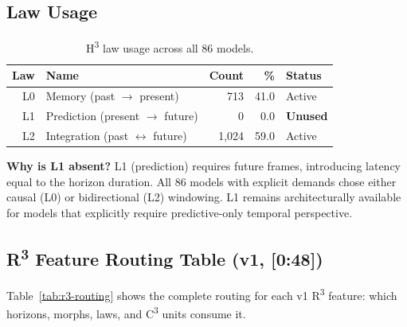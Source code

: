 \subsection{Law Usage}
\label{subsec:routing-laws}

\begin{table}[H]
\centering
\caption{H\textsuperscript{3} law usage across all 86 models.}
\label{tab:law-usage}
\renewcommand{\arraystretch}{1.15}
\begin{tabular}{@{}rlrrl@{}}
\toprule
\textbf{Law} & \textbf{Name} & \textbf{Count} & \textbf{\%} & \textbf{Status} \\
\midrule
L0 & Memory (past $\to$ present)               & 713  & 41.0 & Active \\
L1 & Prediction (present $\to$ future)          &   0  &  0.0 & \textbf{Unused} \\
L2 & Integration (past $\leftrightarrow$ future) & 1{,}024 & 59.0 & Active \\
\bottomrule
\end{tabular}
\end{table}

\noindent
\textbf{Why is L1 absent?}\quad
L1 (prediction) requires future frames, introducing latency equal
to the horizon duration.
All 86 models with explicit demands chose either causal (L0) or
bidirectional (L2) windowing.
L1 remains architecturally available for models that explicitly
require predictive-only temporal perspective.


\subsection{R\textsuperscript{3} Feature Routing Table (v1, [0:48])}
\label{subsec:routing-r3-table}

Table~\ref{tab:r3-routing} shows the complete routing for each v1
R\textsuperscript{3} feature: which horizons, morphs, laws, and
C\textsuperscript{3} units consume it.

